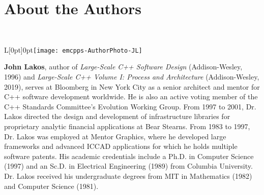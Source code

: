 \cleardoublepage
\chapter*{About the Authors}

\hspace*{\fill}\\  
\par\begin{wrapfigure}[11]{L}[0pt]{0pt}\texttt{[image: emcpps-AuthorPhoto-JL]}\end{wrapfigure}\noindent \textbf{John Lakos}, author of \textit{Large-Scale C++ Software Design} (Addison-Wesley, 1996) and \textit{Large-Scale C++ Volume I: Process and Architecture} (Addison-Wesley, 2019), serves at Bloomberg in New York City as a senior architect and mentor for C++ software development worldwide. He is also an active voting member of the C++ Standards Committee’s Evolution Working Group. From 1997 to 2001, Dr. Lakos directed the design and development of infrastructure libraries for proprietary analytic financial applications at Bear Stearns. From 1983 to 1997, Dr. Lakos was employed at Mentor Graphics, where he developed large frameworks and advanced ICCAD applications for which he holds multiple software patents. His academic credentials include a Ph.D. in Computer Science (1997) and an Sc.D. in Electrical Engineering (1989) from Columbia University. Dr. Lakos received his undergraduate degrees from MIT in Mathematics (1982) and Computer Science (1981).  

